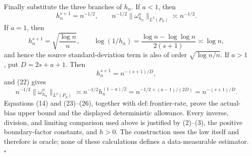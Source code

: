 Finally substitute the three branches of \(h_n\).  If \(a<1\), then
\[
h_n^{s+1}=n^{-1/2},
\qquad n^{-1/2}\|\omega_{h_n}^o\|_{L^2(P_S)}\asymp n^{-1/2}.
\tag{23}
\]
If \(a=1\), then
\[
h_n^{s+1}=\sqrt{\frac{\log n}{n}},
\qquad
\log(1/h_n)=\frac{\log n-\log\log n}{2(s+1)}\asymp\log n,
\tag{24}
\]
and hence the source standard-deviation term is also of order
\(\sqrt{\log n/n}\).  If \(a>1\), put \(D=2s+a+1\).  Then
\[
h_n^{s+1}=n^{-(s+1)/D},
\tag{25}
\]
and (22) gives
\[
n^{-1/2}\|\omega_{h_n}^o\|_{L^2(P_S)}
\asymp n^{-1/2}h_n^{(1-a)/2}
=n^{-1/2+(a-1)/(2D)}
=n^{-(s+1)/D}.
\tag{26}
\]
Equations (14) and (23)--(26), together with
\(\mathrm{def:frontier\text{-}rate}\), prove the actual-bias upper bound and the displayed deterministic allowance.  Every inverse, division, and limiting comparison used above is justified by (2)--(3), the positive boundary-factor constants, and \(h>0\).  The construction uses the law itself and therefore is oracle; none of these calculations defines a data-measurable estimator. \(\square\)